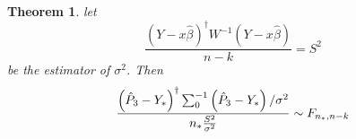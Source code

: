 \documentclass{article}
\newtheorem{theorem}{Theorem}
\begin{document}
\bigskip

\begin{theorem}
let 
\begin{equation*}
\frac{\left( Y-x\hat{\beta}\right) ^{\dagger }W^{-1}\left( Y-x\hat{\beta}%
\right) }{n-k}=S^{2}
\end{equation*}%
be the estimator of $\sigma ^{2}$. Then 
\begin{equation*}
\frac{\left( \hat{P}_{3}-Y_{\ast }\right) ^{\dagger
}\tsum\nolimits_{0}^{-1}\left( \hat{P}_{3}-Y_{\ast }\right) /\sigma ^{2}}{%
n_{\ast }\frac{S^{2}}{\sigma ^{2}}}\sim F_{n_{\ast },n-k}
\end{equation*}
\end{theorem}

\bigskip
\end{document}
